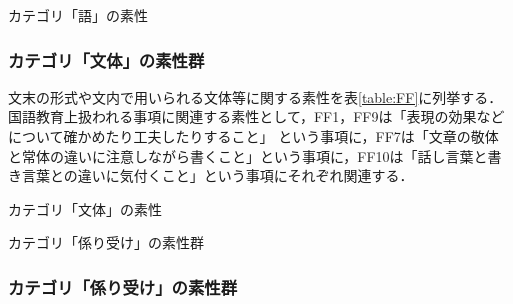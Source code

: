 \documentclass[japanese]{jnlp_1.5}
\let\underline
\newenvironment{indent1zw}{}{}
\begin{document}

\begin{table}[b]
\caption{カテゴリ「語」の素性}
\label{table:FW}

\end{table}


\subsubsection{カテゴリ「文体」の素性群}

文末の形式や文内で用いられる文体等に関する素性を表\ref{table:FF}に列挙する．国語教育上扱われる事項に関連する素性として，FF1，FF9は「表現の効果などについて確かめたり工夫したりすること」\cite{MonbuKagakuSho2008}
という事項に，FF7は「文章の敬体と常体の違いに注意しながら書くこと」\cite{MonbuKagakuSho2008}という事項に，FF10は「話し言葉と書き言葉との違いに気付くこと」\cite{MonbuKagakuSho2008}という事項にそれぞれ関連する．


\begin{table}[b]
\caption{カテゴリ「文体」の素性}
\label{table:FF}

\end{table}
\begin{table}[b]
\caption{カテゴリ「係り受け」の素性群}
\label{table:FD}

\end{table}



\subsubsection{カテゴリ「係り受け」の素性群}
\end{document}
